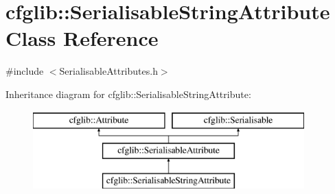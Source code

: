 \hypertarget{classcfglib_1_1SerialisableStringAttribute}{}\section{cfglib\+:\+:Serialisable\+String\+Attribute Class Reference}
\label{classcfglib_1_1SerialisableStringAttribute}


{\ttfamily \#include $<$Serialisable\+Attributes.\+h$>$}

Inheritance diagram for cfglib\+:\+:Serialisable\+String\+Attribute\+:\begin{figure}[H]
\begin{center}
\leavevmode
\includegraphics[height=3.000000cm]{classcfglib_1_1SerialisableStringAttribute}
\end{center}
\end{figure}
